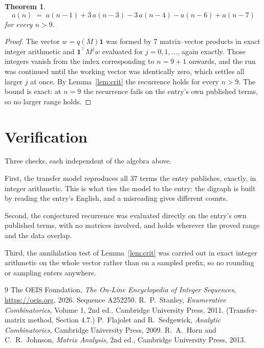 \documentclass[11pt,a4paper]{article}
\theoremstyle{plain}
\newtheorem{theorem}{Theorem}
\theoremstyle{definition}
\begin{document}
\begin{theorem}
\[
a(n)\;=\;a(n-1) + 3\,a(n-3) - 3\,a(n-4) - a(n-6) + a(n-7)
\]
for every $n>9$.
\end{theorem}

\begin{proof}
The vector $w=q(M)\mathbf{1}$ was formed by $7$ matrix--vector products in exact
integer arithmetic and $\mathbf{1}^{\!\top}M^{j}w$ evaluated for $j=0,1,\dots$, again
exactly. Those integers vanish from the index corresponding to $n=9+1$ onwards, and the
run was continued until the working vector was identically zero, which settles all larger $j$
at once. By Lemma~\ref{lem:crit} the recurrence holds for every $n>9$. The bound is exact: at $n=9$ the recurrence fails on the entry's own published terms, so no larger range holds.
\end{proof}

\section{Verification}

Three checks, each independent of the algebra above.

First, the transfer model reproduces all $37$ terms the entry publishes, exactly, in
integer arithmetic. This is what ties the model to the entry: the digraph is built by reading
the entry's English, and a misreading gives different counts.

Second, the conjectured recurrence was evaluated directly on the entry's own published terms,
with no matrices involved, and holds wherever the proved range and the data overlap.

Third, the annihilation test of Lemma~\ref{lem:crit} was carried out in exact integer
arithmetic on the whole vector rather than on a sampled prefix, so no rounding or sampling
enters anywhere.

\begin{thebibliography}{9}
 The OEIS Foundation, \emph{The On-Line Encyclopedia of Integer
Sequences}, \url{https://oeis.org}, 2026. Sequence A252250.
 R.~P.~Stanley, \emph{Enumerative Combinatorics}, Volume 1, 2nd ed.,
Cambridge University Press, 2011. (Transfer-matrix method, Section 4.7.)
 P.~Flajolet and R.~Sedgewick, \emph{Analytic Combinatorics}, Cambridge
University Press, 2009.
 R.~A.~Horn and C.~R.~Johnson, \emph{Matrix Analysis}, 2nd ed., Cambridge
University Press, 2013.
\end{thebibliography}
\end{document}
